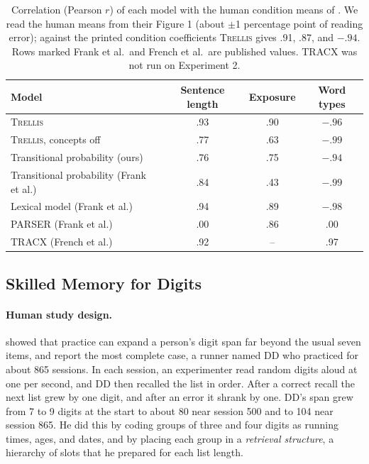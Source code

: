 \documentclass[11pt,letterpaper]{article}
\newcommand{\trellis}{\textsc{Trellis}}
\begin{document}
\begin{table}[!htbp]
\caption{Correlation (Pearson $r$) of each model with the human condition means of \citet{frank-segmentation}. We read the human means from their Figure 1 (about $\pm$1 percentage point of reading error); against the printed condition coefficients \trellis{} gives .91, .87, and $-.94$. Rows marked Frank et al.\ and French et al.\ are published values. TRACX was not run on Experiment 2.}
\label{tab:seg}
\begin{center}
\small
\begin{tabular}{lccc}
\toprule
Model & Sentence length & Exposure & Word types \\
\midrule
\trellis{} & .93 & .90 & $-.96$ \\
\trellis{}, concepts off & .77 & .63 & $-.99$ \\
Transitional probability (ours) & .76 & .75 & $-.94$ \\
Transitional probability (Frank et al.) & .84 & .43 & $-.99$ \\
Lexical model (Frank et al.) & .94 & .89 & $-.98$ \\
PARSER (Frank et al.) & .00 & .86 & .00 \\
TRACX (French et al.) & .92 & -- & .97 \\
\bottomrule
\end{tabular}
\end{center}
\end{table}

\subsection{Skilled Memory for Digits}

\paragraph{Human study design.} \citet{chase-ericsson-skilled} showed that practice can
expand a person's digit span far beyond the usual seven items, and \citet{richman-epam4}
report the most complete case, a runner named DD who practiced for about 865 sessions.
In each session, an experimenter read random digits aloud at one per second, and DD then
recalled the list in order. After a correct recall the next list grew by one digit, and
after an error it shrank by one. DD's span grew from 7 to 9 digits at the start to about
80 near session 500 and to 104 near session 865. He did this by coding groups of three
and four digits as running times, ages, and dates, and by placing each group in a
{\it retrieval structure\/}, a hierarchy of slots that he prepared for each list length.
\end{document}
